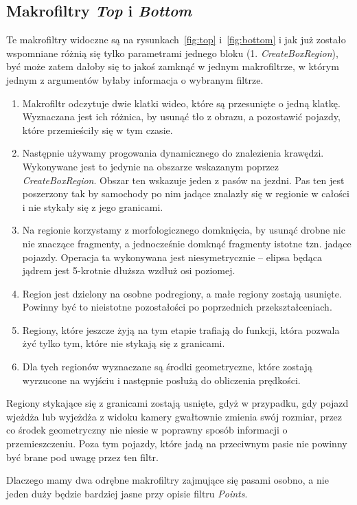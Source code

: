 \documentclass[11pt, a4paper]{article}
\begin{document}
\subsection*{Makrofiltry \emph{Top} i \emph{Bottom}}

Te makrofiltry widoczne są na rysunkach~\ref{fig:top} i~\ref{fig:bottom} i jak już zostało wspomniane różnią się tylko parametrami jednego bloku (1. \emph{CreateBoxRegion}), być może zatem dałoby się to jakoś zamknąć w jednym makrofiltrze, w którym jednym z argumentów byłaby informacja o wybranym filtrze.

\begin{enumerate}
\item Makrofiltr odczytuje dwie klatki wideo, które są przesunięte o jedną klatkę. Wyznaczana jest ich różnica, by usunąć tło z obrazu, a pozostawić pojazdy, które przemieściły się w tym czasie.
\item Następnie używamy progowania dynamicznego do znalezienia krawędzi. Wykonywane jest to jedynie na obszarze wskazanym poprzez \emph{CreateBoxRegion}. Obszar ten wskazuje jeden z pasów na jezdni. Pas ten jest poszerzony tak by samochody po nim jadące znalazły się w regionie w całości i nie stykały się z jego granicami.
\item Na regionie korzystamy z morfologicznego domknięcia, by usunąć drobne nic nie znaczące fragmenty, a jednocześnie domknąć fragmenty istotne tzn. jadące pojazdy. Operacja ta wykonywana jest niesymetrycznie -- elipsa będąca jądrem jest 5-krotnie dłuższa wzdłuż osi poziomej.
\item Region jest dzielony na osobne podregiony, a małe regiony zostają usunięte. Powinny być to nieistotne pozostałości po poprzednich przekształceniach.
\item Regiony, które jeszcze żyją na tym etapie trafiają do funkcji, która pozwala żyć tylko tym, które nie stykają się z granicami.
\item Dla tych regionów wyznaczane są środki geometryczne, które zostają wyrzucone na wyjściu i następnie posłużą do obliczenia prędkości.
\end{enumerate}

Regiony stykające się z granicami zostają usnięte, gdyż w przypadku, gdy pojazd wjeżdża lub wyjeżdża z widoku kamery gwałtownie zmienia swój rozmiar, przez co środek geometryczny nie niesie w poprawny sposób informacji o przemieszczeniu. Poza tym pojazdy, które jadą na przeciwnym pasie nie powinny być brane pod uwagę przez ten filtr.

Dlaczego mamy dwa odrębne makrofiltry zajmujące się pasami osobno, a nie jeden duży będzie bardziej jasne przy opisie filtru \emph{Points}.
\end{document}

